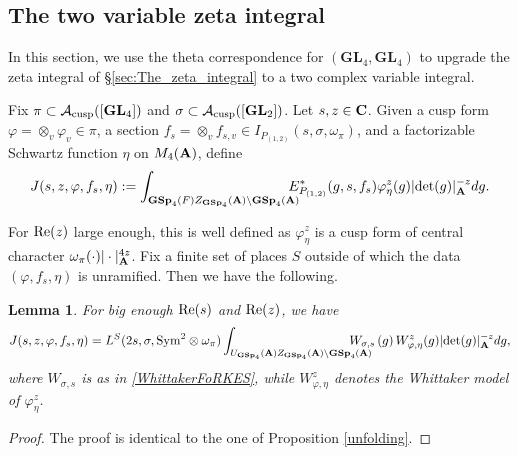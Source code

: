 \documentclass[11pt, reqno]{amsart}
\theoremstyle{plain}
\newtheorem{lemma}[theorem]{Lemma}
\theoremstyle{definition}
\theoremstyle{remark}
\theoremstyle{plain}
\def\C{{\bf C}}
\def\A{{\bf A}}
\def\GSp{{\mathbf{GSp}}}
\def\GL{\mathbf{GL}}
\begin{document}
\subsection{The two variable zeta integral}\label{subsec:TwoVariableZeta}

In this section, we use the theta correspondence for $(\GL_4,\GL_4)$ to upgrade the zeta integral of \S \ref{sec:The_zeta_integral} to a two complex variable integral. 

Fix $\pi \subset \mathcal{A}_{\rm cusp}([\GL_4])$ and $\sigma \subset \mathcal{A}_{\rm cusp}([\GL_2])$. Let $s, z \in \C$. Given a cusp form $\varphi = \otimes_v \varphi_v\in \pi$, a section $f_s = \otimes_v f_{s,v} \in I_{P_{(1,2)}}(s,\sigma,\omega_{\pi})$, and a factorizable Schwartz function $\eta$ on $M_4(\A)$, define \[J(s,z,\varphi,f_s, \eta) := \int_{{\GSp_4}(F) Z_{\GSp_4}(\A)\setminus {\GSp_4}(\A)} \!\!\!\!\!\! E^*_{P_{(1,2)}}(g,s, f_s)\varphi_\eta^z(g)| {\rm det}(g)|_\A^{-z} dg.\]

\noindent For ${\rm Re}(z)$ large enough, this is well defined as $\varphi_\eta^z$ is a cusp form of central character $\omega_\pi(\cdot)| \cdot |^{4z}_\A$. Fix a finite set of places $S$ outside of which the data $(\varphi,f_s, \eta)$ is unramified. Then we have the following. 
\begin{lemma}\label{unfolding_for_2_vars}
    For big enough ${\rm Re}(s)$ and ${\rm Re}(z)$, we have \[J(s,z,\varphi,f_s, \eta) = L^S(2s, \sigma, {\rm Sym}^2 \otimes \omega_\pi)\int_{U_{\GSp_4}(\A)Z_{\GSp_4}(\A)\setminus {\GSp_4}(\A)} \!\!\!\!\!\!\!\!\!\!\!\!W_{\sigma,s}\left(g\right)W_{\varphi,\eta}^z(g)| {\rm det}(g)|_\A^{-z}dg,\]
    where $W_{\sigma,s}$ is as in \eqref{WhittakerFoRKES}, while $W_{\varphi,\eta}^z$ denotes the Whittaker model of $\varphi_\eta^z$.
\end{lemma}
\begin{proof}
    The proof is identical to the one of Proposition \ref{unfolding}.
\end{proof}
\end{document}
